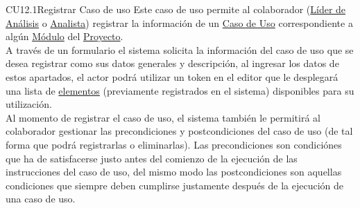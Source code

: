 	\begin{UseCase}{CU12.1}{Registrar Caso de uso}{
			Este caso de uso permite al colaborador (\hyperlink{jefe}{Líder de Análisis} o \hyperlink{analista}{Analista}) registrar la información de un \hyperlink{casoUso}{Caso de Uso} correspondiente a algún \hyperlink{moduloEntidad}{Módulo} del \hyperlink{proyectoEntidad}{Proyecto}.\\
			
			A través de un formulario el sistema solicita la información del caso de uso que se desea registrar como sus datos generales y descripción, al ingresar los datos de estos apartados, el actor podrá utilizar un token en el editor que le desplegará una lista de \hyperlink{tElemento}{elementos} (previamente registrados en el sistema) disponibles para su utilización.\\
			
			Al momento de registrar el caso de uso, el sistema también le permitirá al colaborador gestionar las precondiciones y postcondiciones del caso de uso (de tal forma que podrá registrarlas o eliminarlas). Las precondiciones son condiciónes que ha de satisfacerse justo antes del comienzo de la ejecución de las instrucciones del caso de uso, del mismo modo las postcondiciones son aquellas condiciones que siempre deben cumplirse justamente después de la ejecución de una caso de uso.\\
			
}
\end{UseCase}
